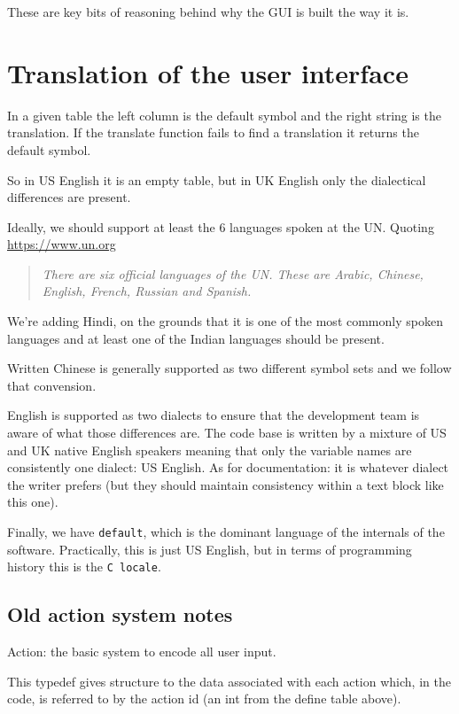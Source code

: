 \documentclass[a4paper]{report}
\begin{document}
These are key bits of reasoning behind why the GUI is built the way it is.

\section{Translation of the user interface}

In a given table the left column is the default symbol and the right string is the translation.
If the translate function fails to find a translation it returns the default symbol.

So in US English it is an empty table, but in UK English
only the dialectical differences are present.

Ideally, we should support at least the 6 languages spoken at the UN. Quoting
\url{https://www.un.org}

\begin{quote}
\emph{There are six official languages of the UN. These are Arabic, Chinese, English, French, Russian and Spanish.}
\end{quote}

We're adding Hindi, on the grounds that it is one of the most commonly spoken languages and at
least one of the Indian languages should be present.

Written Chinese is generally supported as two different symbol sets and we follow that
convension.

English is supported as two dialects to ensure that the development team is aware of what those
differences are. The code base is written by a mixture of US and UK native English speakers
meaning that only the variable names are consistently one dialect: US English. As for
documentation: it is whatever dialect the writer prefers (but they should maintain consistency
within a text block like this one).

Finally, we have \texttt{default}, which is the dominant language
of the internals of the software. Practically, this is
just US English, but in terms of programming history this
is the \texttt{C locale}.

\subsection{Old action system notes}

Action: the basic system to encode all user input.

This typedef gives structure to the data associated with each action
which, in the code, is referred to by the action id (an int from
the define table above).
\end{document}
